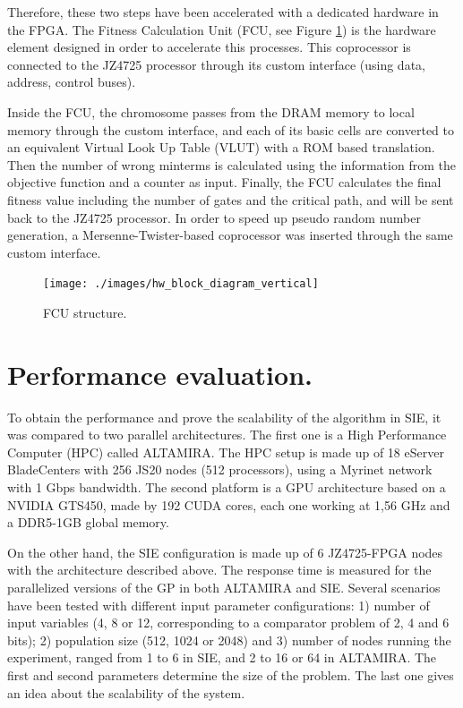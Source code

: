 \documentclass{sig-alternate}
\begin{document}
Therefore, these two steps have been accelerated with a dedicated hardware in the FPGA. The Fitness Calculation Unit (FCU, see Figure \ref{fig:hw_block}) is the hardware element designed in order to accelerate this processes. This coprocessor is connected to the JZ4725 processor through its custom interface (using data, address, control buses).  

Inside the FCU, the chromosome passes from the DRAM memory to local memory through the custom interface, and each of its basic cells are converted to an equivalent Virtual Look Up Table (VLUT) with a ROM based translation. Then the number of wrong minterms is calculated using the information from the objective function and a counter as input. Finally, the FCU calculates the final fitness value including the number of gates and the critical path, and will be sent back to the JZ4725 processor. In order to speed up pseudo random number generation, a Mersenne-Twister-based coprocessor was inserted through the same custom interface. 

\begin{figure}[htpb]
\begin{center} 
\texttt{[image: ./images/hw\_block\_diagram\_vertical]} \end{center}
\caption{FCU structure.}\label{fig:hw_block}
\end{figure}



\section{Performance evaluation.}

To obtain the performance and prove the scalability of the algorithm in SIE, it was compared to two parallel architectures. The first one is a High Performance Computer (HPC) called ALTAMIRA. The HPC setup is made up of 18 eServer BladeCenters with 256 JS20 nodes (512 processors), using a Myrinet network with 1 Gbps bandwidth. The second platform is a GPU architecture based on a NVIDIA GTS450, made by 192 CUDA cores, each one working at 1,56 GHz and a DDR5-1GB global memory.

On the other hand, the SIE configuration is made up of 6 JZ4725-FPGA nodes with the architecture described above. The response time is measured for the parallelized versions of the GP in both ALTAMIRA and SIE. Several scenarios have been tested with different input parameter configurations: 1) number of input variables (4, 8 or 12, corresponding to a comparator problem of 2, 4 and 6 bits); 2) population size (512, 1024 or 2048) and 3) number of nodes running the experiment, ranged from 1 to 6 in SIE, and 2 to 16 or 64 in ALTAMIRA. The first and second parameters determine the size of the problem. The last one gives an idea about the scalability of the system.
\end{document}
